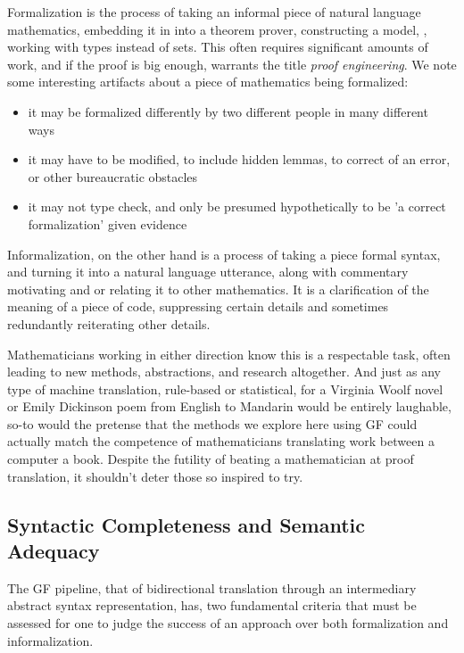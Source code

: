 Formalization is the process of taking an informal piece of natural language
mathematics, embedding it in into a theorem prover, constructing a model, ,
working with types instead of sets. This often requires significant amounts of
work, and if the proof is big enough, warrants the title \emph{proof
engineering}. We note some interesting artifacts about a piece of mathematics
being formalized:

\begin{itemize}

\item it may be formalized differently by two different people in many different ways
\item it may have to be modified, to include hidden lemmas, to correct of an
  error, or other bureaucratic obstacles
\item it may not type check, and only be presumed hypothetically to be 'a
  correct formalization' given evidence 

\end{itemize}

Informalization, on the other hand is a process of taking a piece formal syntax, and turning it into a natural
language utterance, along with commentary motivating and or relating it to other
mathematics. It is a clarification of the meaning of a piece of
code, suppressing certain details and  sometimes
redundantly reiterating other details.

Mathematicians working in either direction know this is a respectable task,
often leading to new methods, abstractions, and research altogether. And just as
any type of machine translation, rule-based or statistical, for a Virginia Woolf
novel or Emily Dickinson poem from English to Mandarin would be entirely
laughable, so-to would the pretense that the methods we explore here using GF
could actually match the competence of mathematicians translating work between a
computer a book. Despite the futility of beating a mathematician at proof
translation, it shouldn't deter those so inspired to try.

\subsection{Syntactic Completeness and Semantic Adequacy}

The GF pipeline, that of bidirectional translation through an intermediary
abstract syntax representation, has, two fundamental criteria that must be
assessed for one to judge the success of an approach over both formalization and
informalization.


